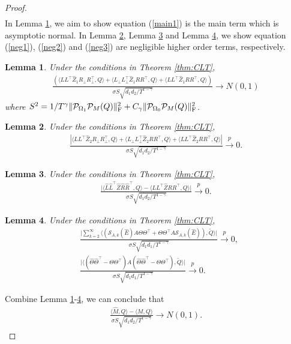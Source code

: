 \documentclass[12pt]{article}
\newcommand\fro[1]{\| #1 \|_{\rm{F}}}
\newcommand{\inp}[2]{\langle #1,#2\rangle}
\def\calP{{\mathcal P}}
\newtheorem{Lemma}{Lemma}
\theoremstyle{plain}
\begin{document}
\begin{proof}
\begin{align}
\end{align}
In Lemma \ref{main term}, we aim to show equation (\ref{main1}) is the main term which is asymptotic normal. In Lemma \ref{lemmaneg1}, Lemma \ref{lemmaneg2} and Lemma \ref{lemmaneg3}, we show equation (\ref{neg1}), (\ref{neg2}) and (\ref{neg3}) are negligible higher order terms, respectively. 
\begin{Lemma}
    \label{main term}
    Under the conditions in Theorem \ref{thm:CLT},
    \begin{align*}
        \frac{\left(\inp{LL^{\top}\widehat{Z}_1R_{\perp}R_{\perp}^{\top}}{Q} + \inp{L_{\perp}L_{\perp}^{\top}\widehat{Z}_1RR^{\top}}{Q} + \inp{LL^{\top}\widehat{Z}_1RR^{\top}}{Q} \right)}{\sigma S\sqrt{d_1d_2/T^{1-\gamma}}} \rightarrow N(0,1)
    \end{align*}
    where $S^2=1/T^{\gamma}\fro{\calP_{\Omega_1}\calP_M(Q)}^2+C_{\gamma}\fro{\calP_{\Omega_0}\calP_M(Q)}^2$.
\end{Lemma}
\begin{Lemma}
    \label{lemmaneg1}
    Under the conditions in Theorem \ref{thm:CLT},
    \begin{align*}
        \frac{\left|\inp{LL^{\top}\widehat{Z}_2R_{\perp}R_{\perp}^{\top}}{Q} + \inp{L_{\perp}L_{\perp}^{\top}\widehat{Z}_2RR^{\top}}{Q} + \inp{LL^{\top}\widehat{Z}_2RR^{\top}}{Q}\right|}{\sigma S\sqrt{d_1d_2/T^{1-\gamma}}}\overset{p}{\rightarrow} 0.
    \end{align*}
\end{Lemma}
\begin{Lemma}
    \label{lemmaneg2}
    Under the conditions in Theorem \ref{thm:CLT},
    \begin{align*}
        \frac{\big|\inp{\widehat{L}\widehat{L}^{\top}\widehat{Z}\widehat{R}\widehat{R}^{\top}}{Q} - \inp{LL^{\top}\widehat{Z}RR^{\top}}{Q}\big|}{\sigma S\sqrt{d_1d_2/T^{1-\gamma}}}
        \overset{p}{\rightarrow} 0. 
    \end{align*}
\end{Lemma}


\begin{Lemma}
    \label{lemmaneg3}
    Under the conditions in Theorem \ref{thm:CLT},
    \begin{align*}
        &\frac{\big|\sum_{k=2}^{\infty} \inp{(\mathcal{S}_{A,k}(\widehat{E})A\Theta\Theta^{\top}+\Theta\Theta^{\top}A\mathcal{S}_{A,k}(\widehat{E}))}{\widetilde{Q}}\big|}{\sigma S\sqrt{d_1d_1/T^{1-\gamma}}}\overset{p}{\rightarrow} 0, \\
        &\frac{\big|\inp{(\widehat{\Theta}\widehat{\Theta}^{\top}-\Theta\Theta^{\top})A(\widehat{\Theta}\widehat{\Theta}^{\top}-\Theta\Theta^{\top})}{\widetilde{Q}}\big|}{\sigma S\sqrt{d_1d_1/T^{1-\gamma}}} \overset{p}{\rightarrow} 0.
    \end{align*}
\end{Lemma}
\noindent Combine Lemma \ref{main term}-\ref{lemmaneg3}, we can conclude that
\begin{align*}
    \frac{\inp{\widehat{M}}{Q}-\inp{M}{Q}}{\sigma S\sqrt{d_1d_2/T^{1-\gamma}}}\rightarrow N(0,1).
\end{align*}   
\end{proof}   
\end{document}
